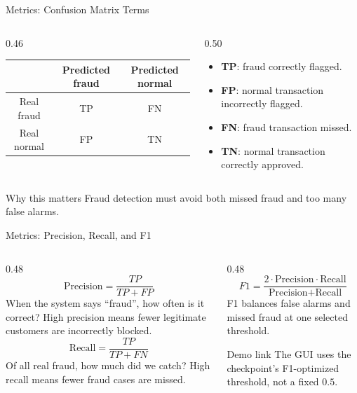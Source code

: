 \documentclass[aspectratio=169,10pt]{beamer}
\begin{document}
\begin{frame}{Metrics: Confusion Matrix Terms}
  \begin{columns}[T]
    \begin{column}{0.46\textwidth}
      \centering
      \begin{tabular}{c|cc}
        & Predicted fraud & Predicted normal \\
        \hline
        Real fraud & TP & FN \\
        Real normal & FP & TN \\
      \end{tabular}
    \end{column}
    \begin{column}{0.50\textwidth}
      \begin{itemize}
        \item \textbf{TP}: fraud correctly flagged.
        \item \textbf{FP}: normal transaction incorrectly flagged.
        \item \textbf{FN}: fraud transaction missed.
        \item \textbf{TN}: normal transaction correctly approved.
      \end{itemize}
    \end{column}
  \end{columns}
  \begin{block}{Why this matters}
    Fraud detection must avoid both missed fraud and too many false alarms.
  \end{block}
\end{frame}

\begin{frame}{Metrics: Precision, Recall, and F1}
  \begin{columns}[T]
    \begin{column}{0.48\textwidth}
      \[
        \text{Precision}=\frac{TP}{TP+FP}
      \]
      \small
      When the system says ``fraud'', how often is it correct? High precision means fewer legitimate customers are incorrectly blocked.
      \vspace{0.4cm}
      \[
        \text{Recall}=\frac{TP}{TP+FN}
      \]
      \small
      Of all real fraud, how much did we catch? High recall means fewer fraud cases are missed.
    \end{column}
    \begin{column}{0.48\textwidth}
      \[
        F1 =
        \frac{2 \cdot \text{Precision} \cdot \text{Recall}}
             {\text{Precision}+\text{Recall}}
      \]
      \small
      F1 balances false alarms and missed fraud at one selected threshold.
      \vspace{0.35cm}
      \begin{block}{Demo link}
        The GUI uses the checkpoint's F1-optimized threshold, not a fixed \(0.5\).
      \end{block}
    \end{column}
  \end{columns}
\end{frame}
\end{document}
